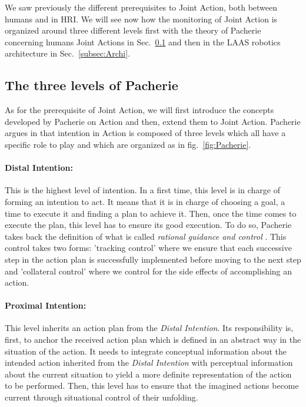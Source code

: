 \documentclass[english,a4paper,11pt,twoside]{StyleThese}
\begin{document}
We saw previously the different prerequisites to Joint Action, both between humans and in HRI. We will see now how the monitoring of Joint Action is organized around three different levels first with the theory of Pacherie concerning humans Joint Actions in Sec.~\ref{subsec:Pacherie} and then in the LAAS robotics architecture in Sec.~\ref{subsec:Archi}.

\subsection{The three levels of Pacherie}

\label{subsec:Pacherie}

As for the prerequisite of Joint Action, we will first introduce the concepts developed by Pacherie on Action and then, extend them to Joint Action. Pacherie argues in \cite{pacherie2008phenomenology} that intention in Action is composed of three levels which all have a specific role to play and which are organized as in fig.~\ref{fig:Pacherie}. 

\paragraph{Distal Intention:} 
This is the highest level of intention. In a first time, this level is in charge of forming an intention to act. It means that it is in charge of choosing a goal, a time to execute it and finding a plan to achieve it. Then, once the time comes to execute the plan, this level has to ensure its good execution. To do so, Pacherie takes back the definition of what is called \textit{rational guidance and control} \cite{buekens2001indexicaliteit}. This control takes two forms: 'tracking control' where we ensure that each successive step in the action plan is successfully implemented before moving to the next step and 'collateral control' where we control for the side effects of accomplishing an action.

\paragraph{Proximal Intention:}
This level inherits an action plan from the \textit{Distal Intention}. Its responsibility is, first, to anchor the received action plan which is defined in an abstract way in the situation of the action. It needs to integrate conceptual information
about the intended action inherited from the \textit{Distal Intention} with perceptual information about the current situation to yield a more definite representation of the action to be performed. Then, this level has to ensure that the imagined actions become current through situational control of their unfolding.
\end{document}
